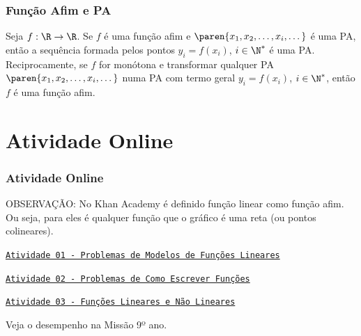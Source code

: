\documentclass[10pt]{beamer}
\begin{document}
\begin{frame}
\frametitle{Função Afim e PA} 

\begin{proposicao}
Seja  $f: \R \to \R$. Se $f$ é uma função afim e $\paren{x_1, x_2,
\dots , x_i, \dots}$ é uma PA, então a sequência formada pelos
pontos $y_i = f(x_i)$, $i \in \N^{\ast}$ é uma PA. Reciprocamente,
se $f$ for monótona e transformar qualquer PA $\paren{x_1, x_2,
\dots , x_i, \dots}$ numa PA com termo geral $y_i = f(x_i)$, $i \in
\N^{\ast}$, então $f$ é uma função afim.
\end{proposicao}


\end{frame}


\section{Atividade Online}
\begin{frame}
\frametitle{Atividade Online} 

OBSERVAÇÃO: No Khan Academy é definido função linear como função
afim. Ou seja, para eles é qualquer função que o gráfico é uma reta
(ou pontos colineares).

\href{https://pt.khanacademy.org/math/cc-eighth-grade-math/cc-8th-linear-equations-functions/8th-linear-functions-modeling/e/constructing-and-interpreting-linear-functions}
{{\tt Atividade 01 - Problemas de Modelos de Funções Lineares}}

\href{https://pt.khanacademy.org/math/cc-eighth-grade-math/cc-8th-linear-equations-functions/constructing-linear-models-real-world/e/constructing-linear-functions-word-problems}
{{\tt Atividade 02 - Problemas de Como Escrever Funções}}

\href{https://pt.khanacademy.org/math/cc-eighth-grade-math/cc-8th-linear-equations-functions/linear-nonlinear-functions-tut/e/linear-non-linear-functions}
{{\tt Atividade 03 - Funções Lineares e Não Lineares}}

Veja o desempenho na Missão 9º ano.


\end{frame}

\end{document}

